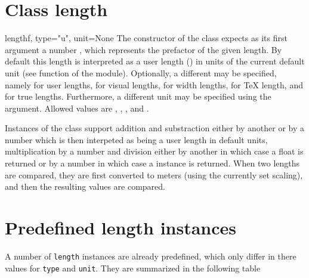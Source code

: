 \section{Class length}

\begin{classdesc}{length}{f, type="u", unit=None}
The constructor of the  class expects as its first
argument a number , which represents the prefactor of the given length.
By default this length is interpreted as a user length () in units
of the current default unit (see  function of the 
module). Optionally, a different  may be specified, namely
 for user lengths,  for visual lengths, 
for width lengths,  for \TeX{} length, and  for true
lengths. Furthermore, a different unit may be specified using the 
argument. Allowed values are , , ,
and .
\end{classdesc}

Instances of the  class support addition and substraction either by another 
or by a number which is then interpeted as being a user length in 
default units, multiplication by a number and division either by another
 in which case a float is returned or by a number in which
case a  instance is returned. When two lengths are
compared, they are first converted to meters (using the currently set
scaling), and then the resulting values are compared.

\section{Predefined length instances}

A number of \verb|length| instances are already predefined, which
only differ in there values for \verb|type| and \verb|unit|. They are
summarized in the following table

